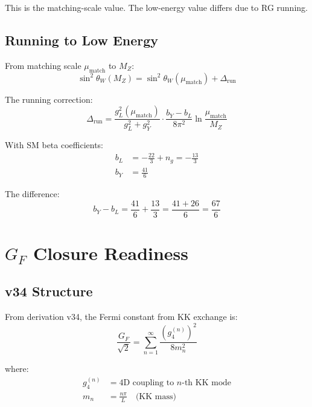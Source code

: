 \documentclass[11pt,a4paper]{article}
\begin{document}
This is the matching-scale value. The low-energy value differs due to RG running.

\subsection{Running to Low Energy}
\label{subsec:weinberg-running}

From matching scale $\mu_{\text{match}}$ to $M_Z$:
\begin{equation}
\label{eq:weinberg-run}
\sin^2\theta_W(M_Z) = \sin^2\theta_W(\mu_{\text{match}}) + \Delta_{\text{run}}
\end{equation}

The running correction:
\begin{equation}
\label{eq:delta-run}
\Delta_{\text{run}} = \frac{g_L^2(\mu_{\text{match}})}{g_L^2 + g_Y^2} \cdot \frac{b_Y - b_L}{8\pi^2} \ln\frac{\mu_{\text{match}}}{M_Z}
\end{equation}

With SM beta coefficients:
\begin{align}
\label{eq:bl-beta}
b_L &= -\frac{22}{3} + n_g = -\frac{13}{3} \\
\label{eq:by-beta}
b_Y &= \frac{41}{6}
\end{align}

The difference:
\begin{equation}
\label{eq:b-diff}
b_Y - b_L = \frac{41}{6} + \frac{13}{3} = \frac{41 + 26}{6} = \frac{67}{6}
\end{equation}

\section{$G_F$ Closure Readiness}
\label{sec:gf-readiness}

\subsection{v34 Structure}
\label{subsec:v34-structure}

From derivation v34, the Fermi constant from KK exchange is:
\begin{equation}
\label{eq:gf-v34}
\frac{G_F}{\sqrt{2}} = \sum_{n=1}^{\infty} \frac{(g_4^{(n)})^2}{8 m_n^2}
\end{equation}

where:
\begin{align}
\label{eq:gf-g4n}
g_4^{(n)} &= \text{4D coupling to } n\text{-th KK mode} \\
\label{eq:gf-mn}
m_n &= \frac{n\pi}{L} \quad \text{(KK mass)}
\end{align}
\end{document}
